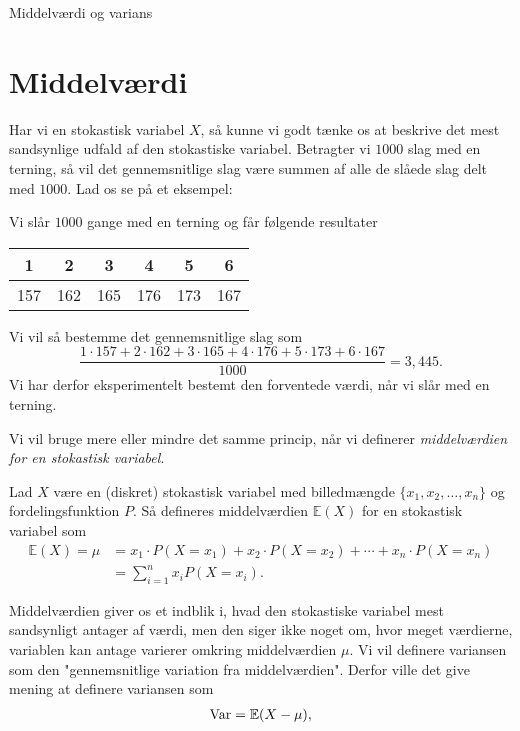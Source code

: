 \begin{center}
\Huge
Middelværdi og varians
\end{center}

\section*{Middelværdi}

Har vi en stokastisk variabel $X$, så kunne vi godt tænke os at beskrive det mest sandsynlige udfald af den stokastiske variabel. Betragter vi $1000$ slag med en terning, så vil det gennemsnitlige slag være summen af alle de slåede slag delt med $1000$. Lad os se på et eksempel:
\begin{exa}
Vi slår $1000$ gange med en terning og får følgende resultater
\begin{center}
\begin{tabular}{c|c|c|c|c|c}
1 & 2 & 3 & 4 & 5 & 6 \\
\hline 
157& 162& 165& 176& 173& 167
\end{tabular}
\end{center}
Vi vil så bestemme det gennemsnitlige slag som
\[
\frac{1\cdot 157 + 2\cdot 162 + 3\cdot 165 + 4 \cdot 176 + 5\cdot 173 + 6\cdot 167}{1000} = 3,445.
\]
Vi har derfor eksperimentelt bestemt den forventede værdi, når vi slår med en terning. 
\end{exa}
Vi vil bruge mere eller mindre det samme princip, når vi definerer \textit{middelværdien for en stokastisk variabel}.
\begin{defn}[Middelværdi]
Lad $X$ være en (diskret) stokastisk variabel med billedmængde $\{x_1,x_2,\hdots,x_n\}$ og fordelingsfunktion $P$. Så defineres middelværdien $\mathbb{E}(X)$ for en stokastisk variabel som
\begin{align*}
\mathbb{E}(X) = \mu &= x_1 \cdot P(X = x_1) + x_2 \cdot P(X=x_2) + \cdots + x_n \cdot P(X=x_n)\\
&= \sum_{i=1}^{n} x_i P(X=x_i).
\end{align*} 
\end{defn}
Middelværdien giver os et indblik i, hvad den stokastiske variabel mest sandsynligt antager af værdi, men den siger ikke noget om, hvor meget værdierne, variablen kan antage varierer omkring middelværdien $\mu$. Vi vil definere variansen som den "gennemsnitlige variation fra middelværdien". Derfor ville det give mening at definere variansen som 
\begin{align*}
\textnormal{Var} = \mathbb{E}(X-\mu), 
\end{align*}
